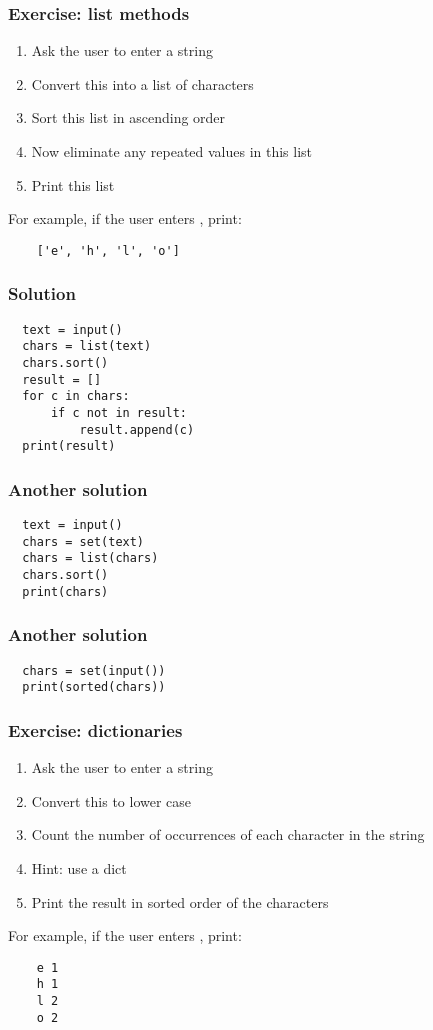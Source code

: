 \documentclass[14pt,compress]{beamer}
\begin{document}
\begin{frame}
  \frametitle{Exercise: list methods}
  \begin{enumerate}
  \item Ask the user to enter a string
  \item Convert this into a list of characters
  \item Sort this list in ascending order
  \item Now eliminate any repeated values in this list
  \item Print this list
  \end{enumerate}
  For example, if the user enters , print:
  \begin{lstlisting}
    ['e', 'h', 'l', 'o']
  \end{lstlisting}
\end{frame}

\begin{frame}
\frametitle{Solution}
\begin{lstlisting}
  text = input()
  chars = list(text)
  chars.sort()
  result = []
  for c in chars:
      if c not in result:
          result.append(c)
  print(result)
\end{lstlisting}
\end{frame}

\begin{frame}
\frametitle{Another solution}
\begin{lstlisting}
  text = input()
  chars = set(text)
  chars = list(chars)
  chars.sort()
  print(chars)
\end{lstlisting}
\end{frame}

\begin{frame}
\frametitle{Another solution}
\begin{lstlisting}
  chars = set(input())
  print(sorted(chars))
\end{lstlisting}
\end{frame}

\begin{frame}
  \frametitle{Exercise: dictionaries}
  \begin{enumerate}
  \item Ask the user to enter a string
  \item Convert this to lower case
  \item Count the number of occurrences of each character in the string
  \item Hint: use a dict
  \item Print the result in sorted order of the characters
  \end{enumerate}
  For example, if the user enters , print:
  \begin{lstlisting}
    e 1
    h 1
    l 2
    o 2
  \end{lstlisting}
\end{frame}
\end{document}
